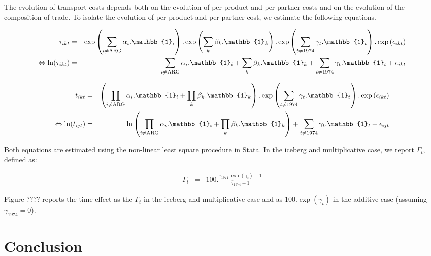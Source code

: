 \documentclass[a4paper,11pt]{article}
\begin{document}
The evolution of transport costs depends both on the evolution of per product and per partner costs and on the evolution of the composition of trade. To isolate the evolution of per product and per partner cost, we estimate the following equations.

\begin{eqnarray}
\tau_{ikt}&=&\exp\left(\sum_{i \neq \text{ARG}}\alpha_i.\mathbb{1}_i\right).\exp\left(\sum_k\beta_k.\mathbb{1}_k\right).\exp\left(\sum_{t \neq 1974}\gamma_t.\mathbb{1}_t\right) .\exp\left(\epsilon_{ikt}\right) \notag \\
\Leftrightarrow \ln(\tau_{ikt})&=&\sum_{i \neq \text{ARG}}\alpha_i.\mathbb{1}_i + \sum_k\beta_k.\mathbb{1}_k + \sum_{t \neq 1974}\gamma_t.\mathbb{1}_t+\epsilon_{ikt}
\end{eqnarray}

\begin{eqnarray}
t_{ikt}&=&\left( \prod_{i \neq \text{ARG}}  \alpha_i.\mathbb{1}_i+\prod_k\beta_k.\mathbb{1}_k\right).\exp\left(\sum_{t \neq 1974}\gamma_t.\mathbb{1}_t\right) .\exp\left(\epsilon_{ikt}\right) \notag \\
\Leftrightarrow \ln(t_{ijt})&=&\ln\left( \prod_{i \neq \text{ARG}}  \alpha_i.\mathbb{1}_i+\prod_k\beta_k.\mathbb{1}_k\right) + \sum_{t \neq 1974}\gamma_t.\mathbb{1}_t+\epsilon_{ijt}
\end{eqnarray}

Both equations are estimated using the non-linear least square procedure in Stata. 
In the iceberg and multiplicative case, we report $\Gamma_t$, defined as:

\begin{eqnarray}
\Gamma_t &=& 100.\frac {\bar{\tau}_{1974}.\exp(\gamma_t)-1} {\bar{\tau}_{1974}-1}
\end{eqnarray}




Figure ???? reports the time effect as the $\Gamma_t$ in the iceberg and multiplicative case and as $100.\exp(\gamma_t)$ in the additive case (assuming $\gamma_{1974}=0$).




\section{Conclusion \label{sec:conclu}}

\newpage




\newpage


\appendix
\end{document}
